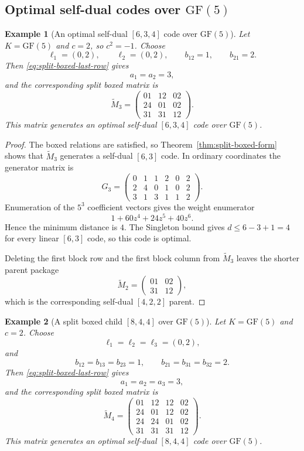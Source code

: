 \documentclass[12pt]{article}
\newtheorem{example}{Example}[section]
\newcommand{\GF}[1]{\ensuremath{\mathrm{GF}(#1)}}
\begin{document}
\subsection{Optimal self-dual codes over \texorpdfstring{\(\GF{5}\)}{GF(5)}}

\begin{example}[An optimal self-dual \texorpdfstring{$[6,3,4]$}{[6,3,4]} code over \texorpdfstring{$\GF{5}$}{GF(5)}]
\label{ex:split-boxed-63}
\rm
Let \(K=\GF{5}\) and \(c=2\), so \(c^2=-1\). Choose
\[
\ell_1=(0,2),\qquad \ell_2=(0,2),\qquad b_{12}=1,\qquad b_{21}=2.
\]
Then \eqref{eq:split-boxed-last-row} gives
\[
a_1=a_2=3,
\]
and the corresponding split boxed matrix is
\[
\widetilde M_3=
\begin{pmatrix}
01 & 12 & 02\\
24 & 01 & 02\\
31 & 31 & 12
\end{pmatrix}.
\]
This matrix generates an optimal self-dual \([6,3,4]\) code over \(\GF{5}\).
\end{example}

\begin{proof}
The boxed relations are satisfied, so Theorem~\ref{thm:split-boxed-form} shows that \(\widetilde M_3\) generates a self-dual \([6,3]\) code. In ordinary coordinates the generator matrix is
\[
G_3=
\left(
\begin{array}{cc|cc|cc}
0&1&1&2&0&2\\
\hline
2&4&0&1&0&2\\
\hline
3&1&3&1&1&2
\end{array}
\right).
\]
Enumeration of the \(5^3\) coefficient vectors gives the weight enumerator
\[
1+60z^4+24z^5+40z^6.
\]
Hence the minimum distance is \(4\).  The Singleton bound gives
\(d\le6-3+1=4\) for every linear \([6,3]\) code, so this code is optimal.

Deleting the first block row and the first block column from \(\widetilde M_3\) leaves the shorter parent package
\[
\widetilde M_2=
\begin{pmatrix}
01 & 02\\
31 & 12
\end{pmatrix},
\]
which is the corresponding self-dual \([4,2,2]\) parent.
\end{proof}

\begin{example}[A split boxed child \texorpdfstring{$[8,4,4]$}{[8,4,4]} over \texorpdfstring{$\GF{5}$}{GF(5)}]
\label{ex:split-boxed-84}
\rm
Let \(K=\GF{5}\) and \(c=2\). Choose
\[
\ell_1=\ell_2=\ell_3=(0,2),
\]
and
\[
b_{12}=b_{13}=b_{23}=1,\qquad
b_{21}=b_{31}=b_{32}=2.
\]
Then \eqref{eq:split-boxed-last-row} gives
\[
a_1=a_2=a_3=3,
\]
and the corresponding split boxed matrix is
\[
\widetilde M_4=
\begin{pmatrix}
01 & 12 & 12 & 02\\
24 & 01 & 12 & 02\\
24 & 24 & 01 & 02\\
31 & 31 & 31 & 12
\end{pmatrix}.
\]
This matrix generates an optimal self-dual \([8,4,4]\) code over \(\GF{5}\).
\end{example}
\end{document}
